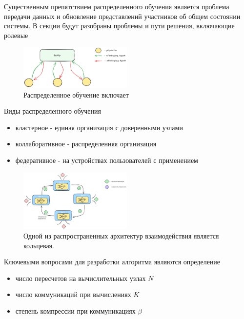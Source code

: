 Существенным препятствием распределенного обучения является 
проблема передачи данных и обновление представлений участников об общем состоянии системы.
В секции будут разобраны проблемы и пути решения, включающие ролевые

\begin{figure}[h]
    \centering
    \includegraphics[width=0.5\textwidth]{assets/math/distributed/distributed.excalidraw.png}
    \caption{Распределенное обучение включает }
    \label{distributed}
\end{figure}


Виды распределенного обучения \begin{itemize}
    \item кластерное - единая организация с доверенными узлами
    \item коллаборативное - распределенняя организация
    \item федеративное - на устройствах пользователей  с применением
\end{itemize}

\begin{figure}[h]
    \centering
    \includegraphics[width=0.5\textwidth]{assets/math/distributed/ring.excalidraw.png}
    \caption{Одной из распространенных архитектур взаимодействия является кольцевая.}
    \label{ring}
\end{figure}

Ключевыми вопросами для разработки алгоритма являются определение \begin{itemize}
    \item число пересчетов на вычислительных узлах $N$
    \item число коммуникаций при вычислениях $K$
    \item степень компрессии при коммуникациях $\beta$ 
\end{itemize}
    
